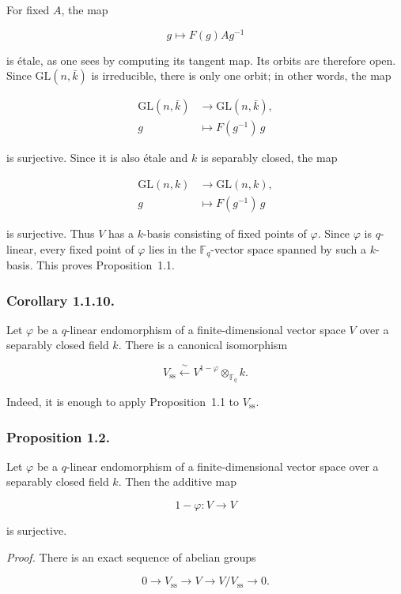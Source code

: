 For fixed $A$, the map

\begin{equation}\tag{1.1.7}
g\longmapsto F(g)Ag^{-1}
\end{equation}

is étale, as one sees by computing its tangent map. Its orbits are therefore
open. Since $\mathrm{GL}(n,\bar k)$ is irreducible, there is only one orbit;
in other words, the map

\begin{equation}\tag{1.1.8}
\begin{aligned}
\mathrm{GL}(n,\bar k)&\longrightarrow\mathrm{GL}(n,\bar k),\\
g&\longmapsto F(g^{-1})\,g
\end{aligned}
\end{equation}

is surjective. Since it is also étale and $k$ is separably closed, the map

\begin{equation}\tag{1.1.9}
\begin{aligned}
\mathrm{GL}(n,k)&\longrightarrow\mathrm{GL}(n,k),\\
g&\longmapsto F(g^{-1})\,g
\end{aligned}
\end{equation}

is surjective. Thus $V$ has a $k$-basis consisting of fixed points of
$\varphi$. Since $\varphi$ is $q$-linear, every fixed point of $\varphi$ lies
in the $\mathbb F_q$-vector space spanned by such a $k$-basis. This proves
Proposition~1.1.

\subsubsection*{Corollary 1.1.10.}
Let $\varphi$ be a $q$-linear endomorphism of a finite-dimensional vector
space $V$ over a separably closed field $k$. There is a canonical
isomorphism

\begin{equation}\tag{1.1.11}
V_{\mathrm{ss}}\xleftarrow{\ \sim\ }
V^{1-\varphi}\otimes_{\mathbb F_q}k.
\end{equation}

Indeed, it is enough to apply Proposition~1.1 to $V_{\mathrm{ss}}$.

\subsubsection*{Proposition 1.2.}
Let $\varphi$ be a $q$-linear endomorphism of a finite-dimensional vector
space over a separably closed field $k$. Then the additive map

\[
1-\varphi:V\longrightarrow V
\]

is surjective.

\medskip
\noindent\emph{Proof.}
There is an exact sequence of abelian groups

\[
0\longrightarrow V_{\mathrm{ss}}\longrightarrow V
\longrightarrow V/V_{\mathrm{ss}}\longrightarrow0.
\]
